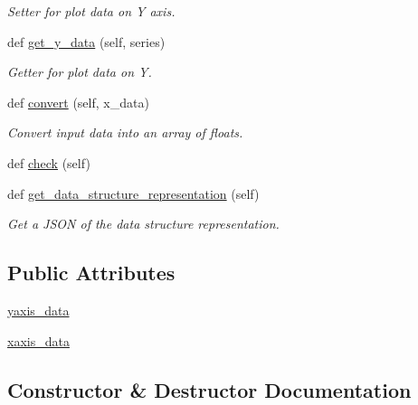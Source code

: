 \begin{DoxyCompactItemize}
\begin{DoxyCompactList}\small\item\em Setter for plot data on Y axis. \end{DoxyCompactList}\item 
def \hyperlink{classbridges_1_1line__chart_1_1_line_chart_ad598554c70b1524eb900b4a66635e367}{get\+\_\+y\+\_\+data} (self, series)
\begin{DoxyCompactList}\small\item\em Getter for plot data on Y. \end{DoxyCompactList}\item 
def \hyperlink{classbridges_1_1line__chart_1_1_line_chart_ab9d76afae32e71d0a640ac26b13e645c}{convert} (self, x\+\_\+data)
\begin{DoxyCompactList}\small\item\em Convert input data into an array of floats. \end{DoxyCompactList}\item 
def \hyperlink{classbridges_1_1line__chart_1_1_line_chart_a4d331f4d5906f70b09efd11728d703a7}{check} (self)
\item 
def \hyperlink{classbridges_1_1line__chart_1_1_line_chart_a51cb18ae6ebe1fa514de14b8006cc238}{get\+\_\+data\+\_\+structure\+\_\+representation} (self)
\begin{DoxyCompactList}\small\item\em Get a J\+S\+ON of the data structure representation. \end{DoxyCompactList}\end{DoxyCompactItemize}
\subsection*{Public Attributes}
\begin{DoxyCompactItemize}
\item 
\hyperlink{classbridges_1_1line__chart_1_1_line_chart_ae32afdcdfe6398ef247f9431de603495}{yaxis\+\_\+data}
\item 
\hyperlink{classbridges_1_1line__chart_1_1_line_chart_a13a52ecfbe82477fd6203aaa7569c1c7}{xaxis\+\_\+data}
\end{DoxyCompactItemize}


\subsection{Constructor \& Destructor Documentation}
\mbox{\label{classbridges_1_1line__chart_1_1_line_chart_a20c96d892b92624aa367710c9b4386fa}} 
